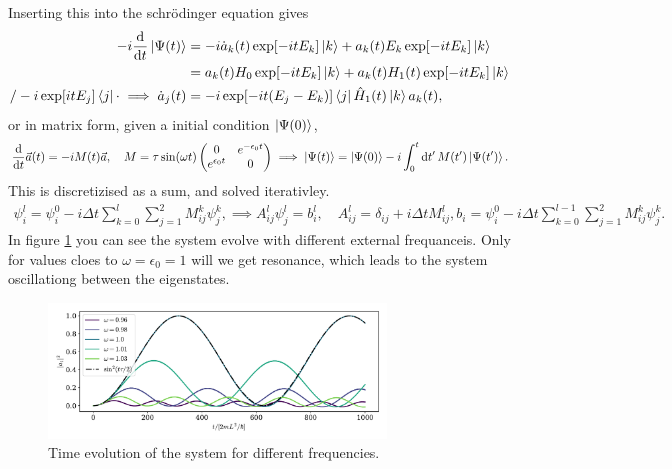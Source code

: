 \documentclass{article}
\begin{document}
    Inserting this into the schrödinger equation gives
    \begin{align*}
        -i\dv{t}\ket{\Psi(t)} 
        & = -i\dot a_k(t)\exp[-itE_k]\ket{k} + a_k(t)E_k\exp[-itE_k]\ket{k} \\ 
        & = a_k(t)H_0\exp[-itE_k] \ket{k} + a_k(t)H_1(t)\exp[-itE_k] \ket{k} \\
        / -i\exp[itE_j]\bra{j} \cdot \implies \dot a_j(t) & = -i\exp[-it(E_j-E_k)]\bra{j} \hat H_1(t) \ket{k} a_k(t),
    \end{align*}
    or in matrix form, given a initial condition $\ket{\Psi(0)}$, 
    \begin{equation*}
        \dv{t} \vec a(t) = -iM(t) \vec{a}, \quad M = \tau \sin(\omega t)
        \begin{pmatrix}
            0 & e^{-\epsilon_0 t} \\
            e^{\epsilon_0 t} & 0
        \end{pmatrix} 
    \implies \ket{\Psi(t)} = \ket{\Psi(0)} - i\int_0^t \dd{t'} M(t')\ket{\Psi(t')}.
    \end{equation*}
    This is discretizised as a sum, and solved iterativley.
    \begin{align*}
        \psi_i^l = \psi_i^0 - i \Delta t \sum_{k=0}^{l} \sum_{j=1}^2 M_{ij}^k \psi_j^k, \implies A_{ij}^l \psi_j^l = b_i^l, \quad A_{ij}^l = \delta_{ij} + i\Delta t M_{ij}^l, b_i = \psi_i^0 - i \Delta t \sum_{k=0}^{l-1} \sum_{j=1}^2 M_{ij}^k \psi_j^k.
    \end{align*}
    In figure \ref{fig:rabi_osc} you can see the system evolve with different external frequanceis. Only for values cloes to $\omega=\epsilon_0=1$ will we get resonance, which leads to the system oscillationg between the eigenstates.


    \begin{figure}
        \centering
        \includegraphics[width=0.8\textwidth]{periodic_detuning/rabi_osc}
        \caption{Time evolution of the system for different frequencies.}
        \label{fig:rabi_osc}
    \end{figure}
\end{document}
